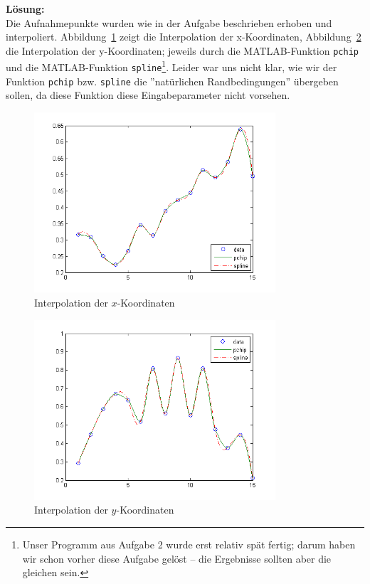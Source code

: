 \documentclass[11pt,a4paper,ngerman]{article}
\begin{document}
\textbf{Lösung:}\\

Die Aufnahmepunkte wurden wie in der Aufgabe beschrieben erhoben und interpoliert. Abbildung~\ref{abb:1} zeigt die Interpolation der x-Koordinaten, Abbildung~\ref{abb:2} die Interpolation der y-Koordinaten; jeweils durch  die MATLAB-Funktion \texttt{pchip} und die MATLAB-Funktion \texttt{spline}\footnote{Unser Programm aus Aufgabe 2 wurde erst relativ spät fertig; darum haben wir schon vorher diese Aufgabe gelöst -- die Ergebnisse sollten aber die gleichen sein.}.
Leider war uns nicht klar, wie wir der Funktion \texttt{pchip} bzw. \texttt{spline} die ''natürlichen Randbedingungen'' übergeben sollen, da diese Funktion diese Eingabeparameter nicht vorsehen.

\begin{figure}[h]
\centering
\includegraphics[width=0.8\textwidth]{plotX.png}
\caption{Interpolation der $x$-Koordinaten\label{abb:1}}
\end{figure}

\begin{figure}[h]
\centering
\includegraphics[width=0.8\textwidth]{plotY.png}
\caption{Interpolation der $y$-Koordinaten\label{abb:2}}
\end{figure}
\end{document}
